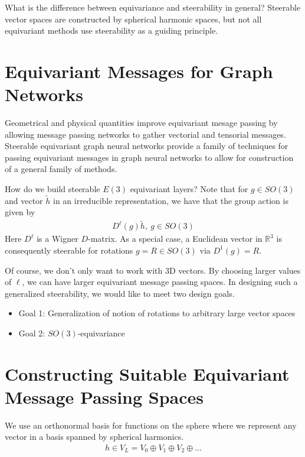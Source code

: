 \documentclass[book.tex]{subfiles}
\begin{document}
What is the difference between equivariance and steerability in general? 
Steerable vector spaces are constructed by spherical harmonic spaces, but not all equivariant methods use steerability as a guiding principle.

\section{Equivariant Messages for Graph Networks}

Geometrical and physical quantities improve equivariant mesage passing by allowing message passing networks to gather vectorial and tensorial messages. Steerable equivariant graph neural networks provide a family of techniques for passing equivariant messages in graph neural networks to allow for construction of a general family of methods.

How do we build steerable $E(3)$ equivariant layers? Note that for $g \in SO(3)$ and vector $\tilde{h}$ in an irreducible representation, we have that the group action is given by
\begin{align}
D^\ell(g)\tilde{h},\ g \in SO(3)
\end{align}
Here $D^\ell$ is a Wigner $D$-matrix. As a special case, a Euclidean vector in $\mathbb{R}^3$ is consequently steerable for rotations $g = R \in SO(3)$ via $D^1(g) = R$.

Of course, we don't only want to work with 3D vectors. By choosing larger values of $\ell$, we can have larger equivariant message passing spaces. In designing such a generalized steerability, we would like to meet two design goals.

\begin{itemize}
\item Goal 1: Generalization of notion of rotations to arbitrary large vector spaces
\item Goal 2: $SO(3)$-equivariance
\end{itemize}

\section{Constructing Suitable Equivariant Message Passing Spaces}

We use an orthonormal basis for functions on the sphere where we represent any vector in a basis spanned by spherical harmonics.
\begin{align}
    h \in V_L = V_0 \oplus V_1 \oplus V_2 \oplus \dotsc
\end{align}
\end{document}
